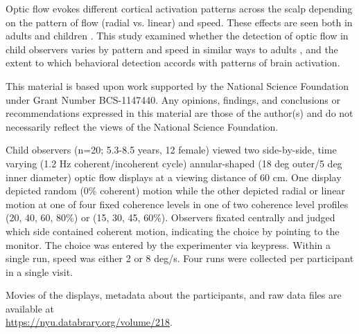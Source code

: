 \documentclass[landscape,final,a0paper,fontscale=0.285]{baposter}
\begin{document}
\begin{poster}
    {
  Optic flow evokes different cortical activation patterns across the scalp depending on the pattern of flow (radial vs. linear) and speed. These effects are seen both in adults \cite{fesi_cortical_2014} and children \cite{gilmore_childrens_2016}. 
  This study examined whether the detection of optic flow in child observers varies by pattern and speed in similar ways to adults \cite{adamiak_adult_observer_2015}\cite{adamiak_adult_2015}, and the extent to which behavioral detection accords with patterns of brain activation.
    }

    {
      This material is based upon work supported by the National Science Foundation under Grant Number BCS-1147440. Any opinions, findings, and conclusions or recommendations expressed in this material are those of the author(s) and do not necessarily reflect the views of the National Science Foundation. 
    }

    {
      Child observers (n=20; 5.3-8.5 years, 12 female) viewed two side-by-side, time varying (1.2 Hz coherent/incoherent cycle) annular-shaped (18 deg outer/5 deg inner diameter) optic flow displays at a viewing distance of 60 cm. One display depicted random (0\% coherent) motion while the other depicted radial or linear motion at one of four fixed coherence levels in one of two coherence level profiles (20, 40, 60, 80\%) or (15, 30, 45, 60\%). Observers fixated centrally and judged which side contained coherent motion, indicating the choice by pointing to the monitor. The choice was entered by the experimenter via keypress. Within a single run, speed was either 2 or 8 deg/s. Four runs were collected per participant in a single visit.
    }

     {
       Movies of the displays, metadata about the participants, and raw data files are available at \\
       \url{https://nyu.databrary.org/volume/218}.
     }


\end{poster}
\end{document}
